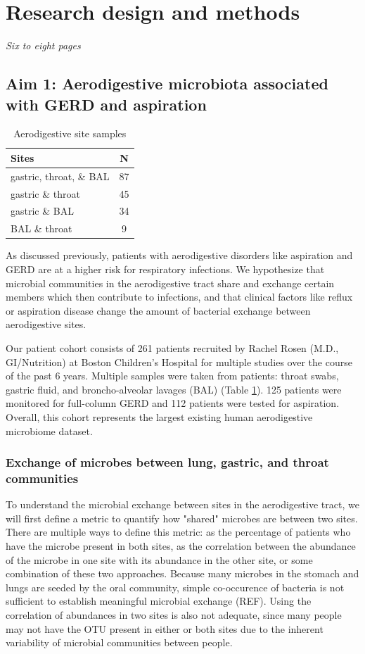 \documentclass[12pt]{article}
\begin{document}
\section{Research design and methods}
\textit{Six to eight pages}

\subsection{Aim 1: Aerodigestive microbiota associated with GERD and aspiration}

\begin{table}
\begin{tabular}{|l|c|}
	\hline
	\textbf{Sites} & \textbf{N} \\
	\hline
	gastric, throat, \& BAL & 87 \\
	gastric \& throat & 45 \\
	gastric \& BAL & 34 \\
	BAL \& throat & 9 \\
	\hline 
\end{tabular}
\caption{Aerodigestive site samples}\label{tab:rosen_samples}
\end{table}

As discussed previously, patients with aerodigestive disorders like aspiration and GERD are at a higher risk for respiratory infections. We hypothesize that microbial communities in the aerodigestive tract share and exchange certain members which then contribute to infections, and that clinical factors like reflux or aspiration disease change the amount of bacterial exchange between aerodigestive sites.

Our patient cohort consists of 261 patients recruited by Rachel Rosen (M.D., GI/Nutrition) at Boston Children's Hospital for multiple studies over the course of the past 6 years. Multiple samples were taken from patients: throat swabs, gastric fluid, and broncho-alveolar lavages (BAL) (Table \ref{tab:rosen_samples}). 125 patients were monitored for full-column GERD and 112 patients were tested for aspiration. Overall, this cohort represents the largest existing human aerodigestive microbiome dataset.


\subsubsection{Exchange of microbes between lung, gastric, and throat communities} \label{sec:exchange}
To understand the microbial exchange between sites in the aerodigestive tract, we will first define a metric to quantify how "shared" microbes are between two sites. There are multiple ways to define this metric: as the percentage of patients who have the microbe present in both sites, as the correlation between the abundance of the microbe in one site with its abundance in the other site, or some combination of these two approaches. Because many microbes in the stomach and lungs are seeded by the oral community, simple co-occurence of bacteria is not sufficient to establish meaningful microbial exchange (REF). Using the correlation of abundances in two sites is also not adequate, since many people may not have the OTU present in either or both sites due to the inherent variability of microbial communities between people.
\end{document}
